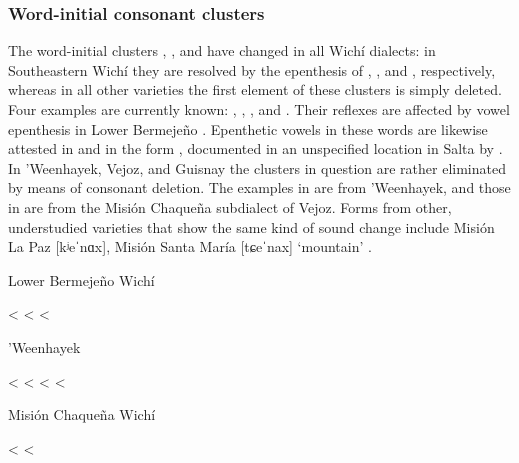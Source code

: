 \subsubsection{Word-initial consonant clusters}\label{wi-cc}

The word-initial clusters , , and  have changed in all Wichí dialects: in Southeastern Wichí they are resolved by the epenthesis of , , and , respectively, whereas in all other varieties the first element of these clusters is simply deleted. Four examples are currently known: , , , and . Their reflexes are affected by vowel epenthesis in Lower Bermejeño . Epenthetic vowels in these words are likewise attested in  \citep[25]{JT09-th} and in the form , documented in an unspecified location in Salta by \citet{MS14}. In ’Weenhayek, Vejoz, and Guisnay the clusters in question are rather eliminated by means of consonant deletion. The examples in  are from ’Weenhayek, and those in  are from the Misión Chaqueña subdialect of Vejoz. Forms from other, understudied varieties that show the same kind of sound change include Misión La Paz [kʲeˈnɑx], Misión Santa María [tɕeˈnax] \recind [tʃeˈnax] `mountain' \citep[67]{SS07,MA08}.

\ea
Lower Bermejeño Wichí \citep{VN14,JB09} \label{wi-kt-t-lb}\\
    \begin{xlist}
        \ex {} < 
        \ex {} < 
        \ex {} < 
    \end{xlist}
\z
\ea
’Weenhayek \citep{KC16} \label{wi-kt-t-whk}\\
    \begin{xlist}
        \ex {} < 
        \ex {} < 
        \ex {} < 
        \ex {} < 
    \end{xlist}
\z
\ea
Misión Chaqueña Wichí \citep{VU74,MG-MELO15} \label{wi-kt-t-mc}\\
    \begin{xlist}
        \ex {} < 
        \ex {} < 
    \end{xlist}
\z
{}

